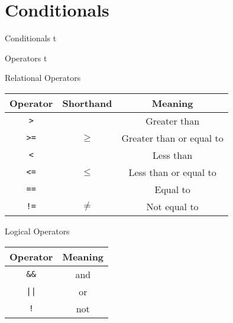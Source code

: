 \documentclass[../lecture3-flowofcontrol.tex]{subfiles}
\begin{document}
\section{Conditionals}


\begin{frame}[fragile]{Conditionals}
t
\end{frame}


\begin{frame}[fragile]{Operators}
t
\end{frame}

\begin{frame}[fragile]{Relational Operators}
    \begin{table}
        \center
        \begin{tabular}{c|c|c}
            \toprule
            \textbf{Operator} & \textbf{Shorthand} & \textbf{Meaning} \\
            \midrule
            \verb|>|  &       & Greater than \\
            \verb|>=| & $\ge$ & Greater than or equal to \\
            \verb|<|  &       & Less than \\
            \verb|<=| & $\le$ & Less than or equal to \\
            \verb|==| &       & Equal to \\
            \verb|!=| & $\ne$ & Not equal to \\
            \bottomrule
        \end{tabular}
    \end{table}
\end{frame}

\begin{frame}[fragile]{Logical Operators}
    \begin{table}
        \center
        \begin{tabular}{c|c}
            \toprule
            \textbf{Operator} & \textbf{Meaning} \\
            \midrule
            \verb|&&| & and \\
            \verb+||+ & or \\
            \verb|!|  & not \\
            \bottomrule
        \end{tabular}
    \end{table}
\end{frame}
\end{document}
